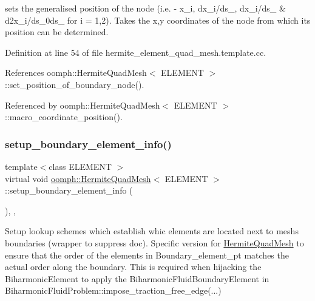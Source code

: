sets the generalised position of the node (i.\+e. -\/ x\+\_\+i, dx\+\_\+i/ds\+\_, dx\+\_\+i/ds\+\_ \& d2x\+\_\+i/ds\+\_\+0ds\+\_ for i = 1,2). Takes the x,y coordinates of the node from which its position can be determined. 



Definition at line 54 of file hermite\+\_\+element\+\_\+quad\+\_\+mesh.\+template.\+cc.



References oomph\+::\+Hermite\+Quad\+Mesh$<$ E\+L\+E\+M\+E\+N\+T $>$\+::set\+\_\+position\+\_\+of\+\_\+boundary\+\_\+node().



Referenced by oomph\+::\+Hermite\+Quad\+Mesh$<$ E\+L\+E\+M\+E\+N\+T $>$\+::macro\+\_\+coordinate\+\_\+position().

\mbox{\label{classoomph_1_1HermiteQuadMesh_a6eefe872b5bf8a06174b536d9727ea44}} 
\subsubsection{\texorpdfstring{setup\+\_\+boundary\+\_\+element\+\_\+info()}{setup\_boundary\_element\_info()}\hspace{0.1cm}{\footnotesize\ttfamily [1/2]}}
{\footnotesize\ttfamily template$<$class E\+L\+E\+M\+E\+NT $>$ \\
virtual void \hyperlink{classoomph_1_1HermiteQuadMesh}{oomph\+::\+Hermite\+Quad\+Mesh}$<$ E\+L\+E\+M\+E\+NT $>$\+::setup\+\_\+boundary\+\_\+element\+\_\+info (\begin{DoxyParamCaption}{ }\end{DoxyParamCaption})\hspace{0.3cm}{\ttfamily [inline]}, {\ttfamily [private]}, {\ttfamily [virtual]}}

Setup lookup schemes which establish whic elements are located next to mesh\textquotesingle{}s boundaries (wrapper to suppress doc). Specific version for \hyperlink{classoomph_1_1HermiteQuadMesh}{Hermite\+Quad\+Mesh} to ensure that the order of the elements in Boundary\+\_\+element\+\_\+pt matches the actual order along the boundary. This is required when hijacking the Biharmonic\+Element to apply the Biharmonic\+Fluid\+Boundary\+Element in Biharmonic\+Fluid\+Problem\+::impose\+\_\+traction\+\_\+free\+\_\+edge(...) 

